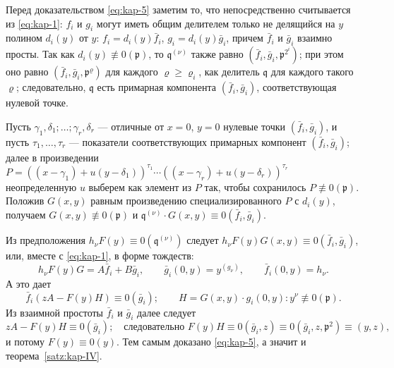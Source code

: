 \documentclass[11pt]{article}
\theoremstyle{plain}
\begin{document}
Перед доказательством \eqref{eq:kap-5} заметим то, что
непосредственно считывается из \eqref{eq:kap-1}: $f_{i}$ и $g_{i}$
могут иметь общим делителем только не делящийся на $y$ полином
$d_{i}(y)$ от $y$: $f_{i} = d_{i}(y)\bar{f}_{i}$,
$g_{i} = d_{i}(y)\bar{g}_{i}$, причем $\bar{f}_{i}$ и
$\bar{g}_{i}$ взаимно просты. Так как
$d_{i}(y) \not\equiv 0(\mathfrak{p})$, то
$\mathfrak{q}^{(\nu)}$ также равно
$(\bar{f}_{i}, \bar{g}_{i}, \mathfrak{p}^{2^{i}})$; при этом оно
равно $(\bar{f}_{i}, \bar{g}_{i}, \mathfrak{p}^{\varrho})$ для
каждого $\varrho \geq \varrho_{i}$, как делитель $\mathfrak{q}$ для
каждого такого $\varrho$; следовательно, $\mathfrak{q}$ есть
примарная компонента $(\bar{f}_{i}, \bar{g}_{i})$, соответствующая
нулевой точке.

Пусть $\gamma_{1}, \delta_{1}; \ldots; \gamma_{r}, \delta_{r}$ ---
отличные от $x = 0$, $y = 0$ нулевые точки
$(\bar{f}_{i}, \bar{g}_{i})$, и пусть
$\tau_{1}, \ldots, \tau_{r}$ --- показатели соответствующих
примарных компонент $(\bar{f}_{i}, \bar{g}_{i})$; далее в произведении
$P = ((x-\gamma_{1}) + u(y-\delta_{1}))^{\tau_{1}} \cdots
((x-\gamma_{r}) + u(y-\delta_{r}))^{\tau_{r}}$ неопределенную $u$
выберем как элемент из $P$ так, чтобы сохранилось
$P \not\equiv 0(\mathfrak{p})$. Положив $G(x,y)$ равным произведению
специализированного $P$ с $d_{i}(y)$, получаем
$G(x,y) \not\equiv 0(\mathfrak{p})$ и
$\mathfrak{q}^{(\nu)} \cdot G(x,y) \equiv 0(\bar{f}_{i}, \bar{g}_{i})$.

Из предположения $h_{\nu}F(y) \equiv 0(\mathfrak{q}^{(\nu)})$ следует
$h_{\nu}F(y)G(x,y) \equiv 0(\bar{f}_{i}, \bar{g}_{i})$, или, вместе с
\eqref{eq:kap-1}, в форме тождеств:
\[
h_{\nu}F(y)G = A\bar{f}_{i} + B\bar{g}_{i}, \qquad
\bar{g}_{i}(0,y) = y^{(g_{\nu})}, \qquad
\bar{f}_{i}(0,y) = h_{\nu}.
\]
А это дает
\[
\bar{f}_{i}(zA - F(y)H) \equiv 0(\bar{g}_{i}); \qquad
H = G(x,y) \cdot g_{i}(0,y) : y^{\nu} \not\equiv 0(\mathfrak{p}).
\]
Из взаимной простоты $\bar{f}_{i}$ и $\bar{g}_{i}$ далее следует
\[
zA - F(y)H \equiv 0(\bar{g}_{i}); \quad \text{следовательно } F(y)H \equiv 0(\bar{g}_{i}, z)
\equiv 0(\bar{g}_{i}, z, \mathfrak{p}^{2}) \equiv (y, z),
\]
и потому $F(y) \equiv 0(y)$. Тем самым доказано \eqref{eq:kap-5}, а
значит и теорема~\ref{satz:kap-IV}.
\end{document}
